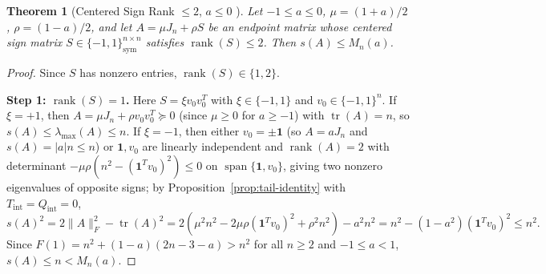 \documentclass[11pt,reqno]{article}
\newtheorem{theorem}{Theorem}[section]
\theoremstyle{definition}
\newcommand{\one}{\mathbf{1}}
\newcommand{\tr}{\operatorname{tr}}
\newcommand{\rank}{\operatorname{rank}}
\begin{document}
\begin{theorem}[Centered Sign Rank $\le 2$, $a \le 0$ {\cite{holden2026b}}]\label{thm:centered-rank2}
Let $-1 \le a \le 0$, $\mu = (1+a)/2$, $\rho = (1-a)/2$, and let $A = \mu J_n + \rho S$ be an endpoint matrix whose centered sign matrix $S \in \{-1, 1\}^{n \times n}_{\mathrm{sym}}$ satisfies $\rank(S) \le 2$. Then $s(A) \le M_n(a)$.
\end{theorem}
\begin{proof}
Since $S$ has nonzero entries, $\rank(S) \in \{1, 2\}$.

\medskip\noindent\textbf{Step 1: $\rank(S) = 1$.}
Here $S = \xi v_0 v_0^T$ with $\xi \in \{-1, 1\}$ and $v_0 \in \{-1, 1\}^n$. If $\xi = +1$, then $A = \mu J_n + \rho v_0 v_0^T \succeq 0$ (since $\mu \ge 0$ for $a \ge -1$) with $\tr(A) = n$, so $s(A) \le \lambda_{\max}(A) \le n$. If $\xi = -1$, then either $v_0 = \pm \one$ (so $A = a J_n$ and $s(A) = |a|n \le n$) or $\one, v_0$ are linearly independent and $\rank(A) = 2$ with determinant $-\mu\rho(n^2 - (\one^T v_0)^2) \le 0$ on $\operatorname{span}\{\one, v_0\}$, giving two nonzero eigenvalues of opposite signs; by Proposition~\ref{prop:tail-identity} with $T_{\mathrm{int}} = Q_{\mathrm{int}} = 0$,
\[
s(A)^2 = 2\|A\|_F^2 - \tr(A)^2 = 2(\mu^2 n^2 - 2\mu\rho (\one^T v_0)^2 + \rho^2 n^2) - a^2 n^2 = n^2 - (1 - a^2)(\one^T v_0)^2 \le n^2.
\]
Since $F(1) = n^2 + (1-a)(2n - 3 - a) > n^2$ for all $n \ge 2$ and $-1 \le a < 1$, $s(A) \le n < M_n(a)$.


\end{proof}
\end{document}
